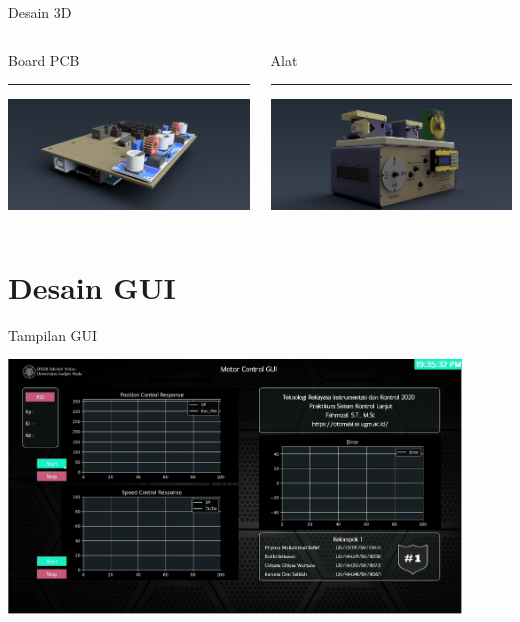 \documentclass[10pt,xcolor={dvipsnames}]{beamer}
\begin{document}
\begin{frame}{Desain 3D}
	\begin{columns}[T] %
		\begin{column}{0.48\textwidth}
			Board PCB
			\color{black}\rule{\linewidth}{4pt}
			\includegraphics[width=7.5cm]{Render/Main Board_v3 (Home).png}
		\end{column}%
		\hfill%
		\begin{column}{0.48\textwidth}
			Alat
			\color{blue}\rule{\linewidth}{4pt}
				\includegraphics[width=7.5cm]{Render/Feedback Actuator UNIT ES151(Home).png}
		\end{column}
	\end{columns}
\end{frame}

\section{Desain GUI}
\begin{frame}{Tampilan GUI}
		\begin{center}
		\includegraphics[width=12.0cm]{Tampilan GUI/Desain GUI.png}
	\end{center}
\end{frame}
\end{document}
